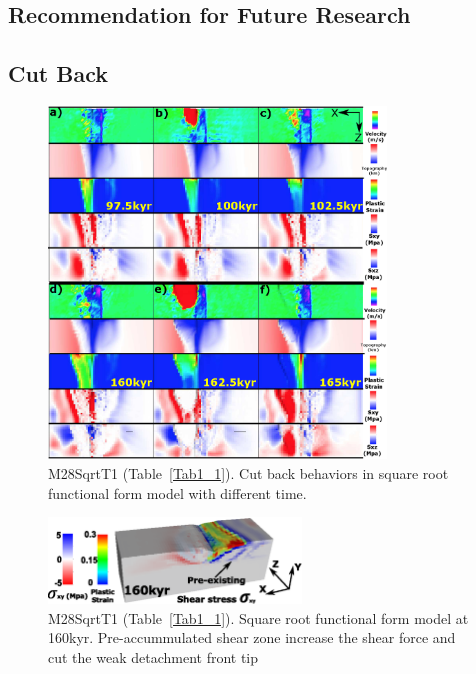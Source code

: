 \subsection{Recommendation for Future Research}
\fi

\iffalse
\subsection{Cut Back}\label{Sec_CutBack}

\begin{figure}[h]
  \centering
    \includegraphics[width=0.8\textwidth]{./Figures/fig_Results4_4_sqrt_cut_back_with_time.eps}
  \caption{M28SqrtT1 (Table~\hyperref[Tab1_1]{\ref{Tab1_1}}). Cut back behaviors in square root functional form model with different time.}
 \label{fig_Results4_4}
\end{figure}   

\begin{figure}[h]
  \centering
    \includegraphics[width=0.6\textwidth]{./Figures/fig_Results4_5_sqrt_cut_back_pre_accummulated_shear_zone.eps}
  \caption{M28SqrtT1 (Table~\hyperref[Tab1_1]{\ref{Tab1_1}}). Square root functional form model at 160kyr. Pre-accummulated shear zone increase the shear force and cut the weak detachment front tip}
 \label{fig_Results4_5}
\end{figure}   

